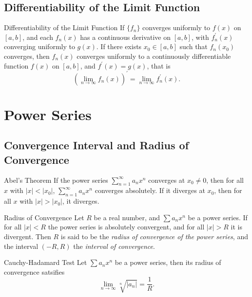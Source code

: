 \subsection{Differentiability of the Limit Function}

\begin{theorem}{Differentiability of the Limit Function}{}
  If $\{f_n\}$ converges uniformly to $f(x)$ on $[a, b]$,
  and each $f_n(x)$ has a continuous derivative on $[a, b]$,
  with $f_n^{\prime}(x)$ converging uniformly to $g(x)$.
  If there exists $x_0 \in [a, b]$ such that $f_n(x_0)$ converges,
  then $f_n(x)$ converges uniformly to a continuously differentiable function $f(x)$
  on $[a, b]$, and $f^{\prime}(x) = g(x)$, that is
  \begin{equation}
    (\lim \limits _{n \rightarrow \infty} f_n(x))^{\prime}
    = \lim \limits _{n \rightarrow \infty} f_n^{\prime}(x).
  \end{equation}
\end{theorem}


\section{Power Series}

\subsection{Convergence Interval and Radius of Convergence}

\begin{theorem}{Abel's Theorem}{}
  If the power series $\sum\limits_{n = 1}^{\infty} a_nx^n$
  converges at $x_0 \neq 0$,
  then for all $x$ with $|x| < |x_0|$,
  $\sum\limits_{n = 1}^{\infty} a_nx^n$ converges absolutely.
  If it diverges at $x_0$,
  then for all $x$ with $|x| > |x_0|$, it diverges.
\end{theorem}

\begin{definition}{Radius of Convergence}{}
 Let $R$ be a real number, and $\sum a_nx^n$ be a power series.
 If for all $|x| < R$ the power series is absolutely convergent,
 and for all $|x| > R$ it is divergent.
 Then $R$ is said to be the \emph{radius of convergence of the power series},
 and the interval $(-R, R)$ the \emph{interval of convergence}.
\end{definition}

\begin{proposition}{Cauchy-Hadamard Test}{}
  Let $\sum a_nx^n$ be a power series, then its radius of convergence satsifies
  \begin{equation}
    \lim \limits _{n \rightarrow \infty} \sqrt[n]{|a_n|} = \frac{1}{R}.
  \end{equation}
\end{proposition}

